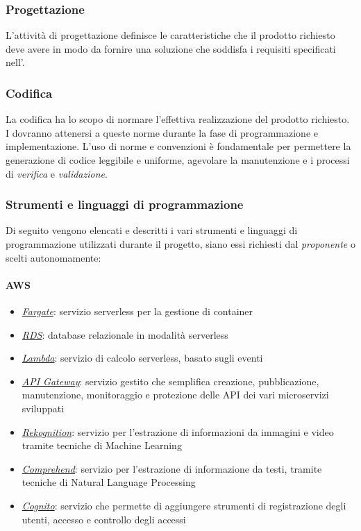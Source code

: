 \subsubsection{Progettazione} %
L'attività di progettazione definisce le caratteristiche che il prodotto richiesto deve avere in modo da fornire una soluzione che soddisfa i requisiti specificati nell'\AdR{}.


\subsubsection{Codifica} %
La codifica ha lo scopo di normare l'effettiva realizzazione del prodotto richiesto. I \progrs{} dovranno attenersi a queste norme durante la fase di programmazione e implementazione. L'uso di norme e convenzioni è fondamentale per permettere la generazione di codice leggibile e uniforme, agevolare la manutenzione e i processi di \emph{verifica} e \emph{validazione}.

\subsubsection{Strumenti e linguaggi di programmazione}
Di seguito vengono elencati e descritti i vari strumenti e linguaggi di programmazione utilizzati durante il progetto, siano essi richiesti dal \emph{proponente} o scelti autonomamente:
\paragraph*{AWS}
\begin{itemize}
	\item \href{https://aws.amazon.com/fargate/}{\emph{Fargate}}: servizio serverless per la gestione di container
	\item \href{https://aws.amazon.com/rds/}{\emph{RDS}}: database relazionale in modalità serverless
	\item \href{https://aws.amazon.com/lambda/}{\emph{Lambda}}: servizio di calcolo serverless, basato sugli eventi
	\item \href{https://aws.amazon.com/fargate/}{\emph{API Gateway}}: servizio gestito che semplifica creazione, pubblicazione, manutenzione, monitoraggio e protezione delle API dei vari microservizi sviluppati
	\item \href{https://aws.amazon.com/rekognition/}{\emph{Rekognition}}: servizio per l'estrazione di informazioni da immagini e video tramite tecniche di Machine Learning
	\item \href{https://aws.amazon.com/comprehend/}{\emph{Comprehend}}: servizio per l'estrazione di informazione da testi, tramite tecniche di Natural Language Processing
	\item \href{https://aws.amazon.com/cognito/}{\emph{Cognito}}: servizio che permette di aggiungere strumenti di registrazione degli utenti, accesso e controllo degli accessi 
\end{itemize}
